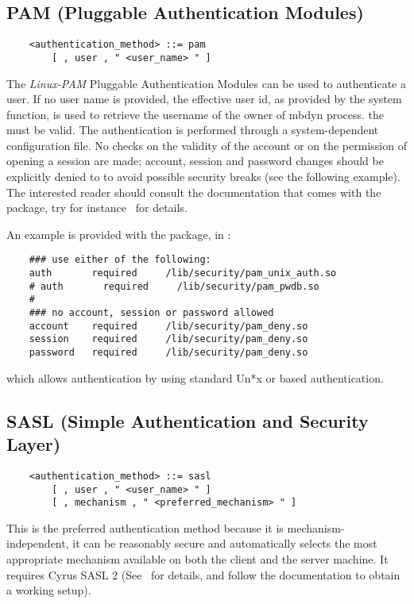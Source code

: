 \subsection{PAM (Pluggable Authentication Modules)}
\begin{verbatim}
    <authentication_method> ::= pam 
        [ , user , " <user_name> " ]
\end{verbatim}
The {\em Linux-PAM} Pluggable Authentication Modules can be used to
authenticate a user. 
If no user name is provided, the effective user id, as provided by the 
 system function, is used to retrieve the username of the
owner of mbdyn process.
the  must be valid. 
The authentication is performed through a system-dependent 
configuration file.
No checks on the validity of the account or on the permission of opening a
session are made; account, session and password changes should be explicitly
denied to  to avoid possible security breaks (see the following
example).
The interested reader should consult the documentation that comes with the
package, try for instance
\
for details.

\noindent
An example is provided with the package, in  :
\begin{verbatim}
    ### use either of the following:
    auth       required     /lib/security/pam_unix_auth.so
    # auth       required     /lib/security/pam_pwdb.so
    #
    ### no account, session or password allowed
    account    required     /lib/security/pam_deny.so
    session    required     /lib/security/pam_deny.so
    password   required     /lib/security/pam_deny.so
\end{verbatim}
which allows authentication by using standard Un*x or  based
authentication.



\subsection{SASL (Simple Authentication and Security Layer)}
\begin{verbatim}
    <authentication_method> ::= sasl
        [ , user , " <user_name> " ]
        [ , mechanism , " <preferred_mechanism> " ]
\end{verbatim}
This is the preferred authentication method because 
it is mechanism-independent, it can be reasonably secure
and automatically selects the most appropriate mechanism available
on both the client and the server machine.
It requires Cyrus SASL 2 (See 
\
for details, and follow the documentation to obtain a working setup).



